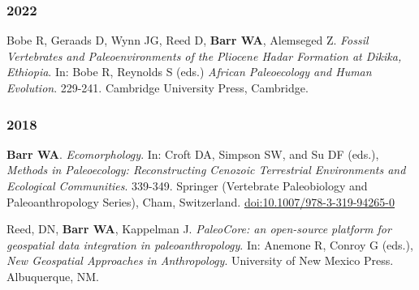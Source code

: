 \subsubsection*{2022}

\item Bobe R, Geraads D, Wynn JG, Reed D, {\bfseries Barr WA}, Alemseged Z. \emph{Fossil Vertebrates and Paleoenvironments of the Pliocene Hadar Formation at Dikika, Ethiopia}. In: Bobe R, Reynolds S (eds.) \emph{African Paleoecology and Human Evolution}. 229-241. Cambridge University Press, Cambridge. 

\subsubsection*{2018}


\item {\bfseries Barr WA}. \emph{Ecomorphology}. In: Croft DA, Simpson SW, and Su DF (eds.), \emph{Methods in Paleoecology: Reconstructing Cenozoic Terrestrial Environments and Ecological Communities}. 339-349. Springer (Vertebrate Paleobiology and Paleoanthropology Series), Cham, Switzerland. \href{https://doi.org/10.1007/978-3-319-94265-0}{doi:10.1007/978-3-319-94265-0}

\item  Reed, DN, {\bfseries Barr WA}, Kappelman J. \emph{PaleoCore: an open-source platform for geospatial data integration in paleoanthropology}. In: Anemone R, Conroy G (eds.), \emph{New Geospatial Approaches in Anthropology}. University of New Mexico Press. Albuquerque, NM.